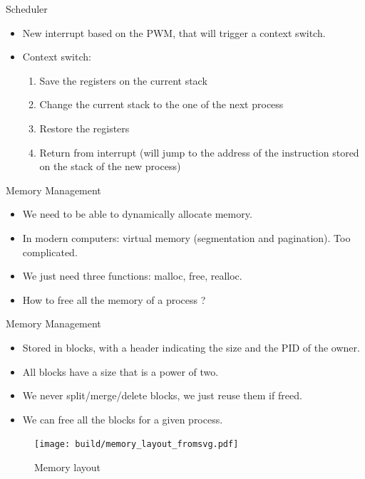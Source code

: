 \documentclass{beamer}
\begin{document}
    \begin{frame}{Scheduler}
      \begin{itemize}
        \item New interrupt based on the PWM, that will trigger a context switch.
        \item Context switch:
        \begin{enumerate}
           \item Save the registers on the current stack
           \item Change the current stack to the one of the next process
           \item Restore the registers
           \item Return from interrupt (will jump to the address of the instruction stored on the stack of the new process)
        \end{enumerate}
      \end{itemize}
    \end{frame}


    \begin{frame}{Memory Management}
      \begin{itemize}
        \item We need to be able to dynamically allocate memory.
        \item In modern computers: virtual memory (segmentation and pagination). Too complicated.
        \item We just need three functions: malloc, free, realloc.
        \item How to free all the memory of a process ?
      \end{itemize}
    \end{frame}
    
    \begin{frame}{Memory Management}
      \begin{itemize}
        \item Stored in blocks, with a header indicating the size and the PID of the owner.
        \item All blocks have a size that is a power of two.
        \item We never split/merge/delete blocks, we just reuse them if freed.
        \item We can free all the blocks for a given process.
      \end{itemize}
    \end{frame}

    \begin{frame}[plain]
      \begin{figure}
        \begin{minipage}[c]{0.5\textwidth}
          \caption{Memory layout}
        \end{minipage}\hfill
        \begin{minipage}[c]{0.5\textwidth}
          \texttt{[image: build/memory\_layout\_fromsvg.pdf]}
        \end{minipage}
      \end{figure}
    \end{frame}
\end{document}

